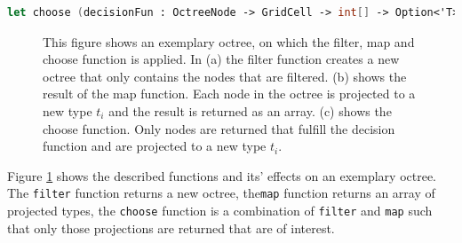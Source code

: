 \begin{lstlisting}[language = FSharp]
let choose (decisionFun : OctreeNode -> GridCell -> int[] -> Option<'T>*bool) (tree: Octree) :('T[]) = ...
\end{lstlisting}


\begin{figure}[h]
    \centering
    \par\medskip
    \par\medskip        
    \caption{This figure shows an exemplary octree, on which the filter, map and choose function is applied. In (a) the filter function creates a new octree that only contains the nodes that are filtered. (b) shows the result of the map function. Each node in the octree is projected to a new type $t_{i}$ and the result is returned as an array. (c) shows the choose function. Only nodes are returned that fulfill the decision function and are projected to a new type $t_{i}$. }
    \label{fig:octreeFuns}
\end{figure}

Figure \ref{fig:octreeFuns} shows the described functions and its' effects on an exemplary octree. The \verb|filter| function returns a new octree, the\verb|map| function returns an array of projected types, the \verb|choose| function is a combination of \verb|filter| and \verb|map| such that only those projections are returned that are of interest. 



